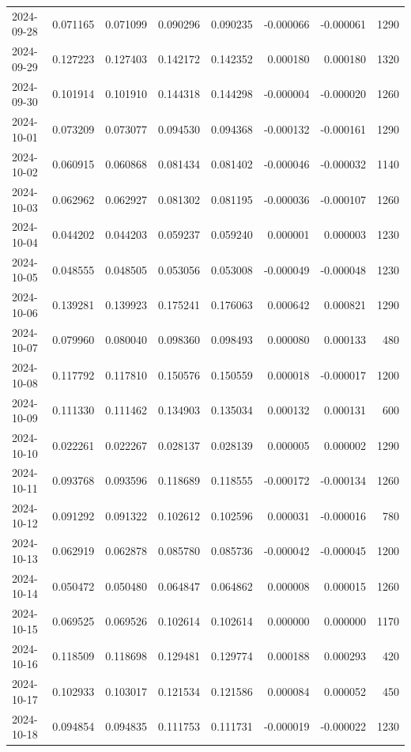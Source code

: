 \begin{tabular}{lrrrrrrr}
2024-09-28 & 0.071165 & 0.071099 & 0.090296 & 0.090235 & -0.000066 & -0.000061 & 1290 \\
2024-09-29 & 0.127223 & 0.127403 & 0.142172 & 0.142352 & 0.000180 & 0.000180 & 1320 \\
2024-09-30 & 0.101914 & 0.101910 & 0.144318 & 0.144298 & -0.000004 & -0.000020 & 1260 \\
2024-10-01 & 0.073209 & 0.073077 & 0.094530 & 0.094368 & -0.000132 & -0.000161 & 1290 \\
2024-10-02 & 0.060915 & 0.060868 & 0.081434 & 0.081402 & -0.000046 & -0.000032 & 1140 \\
2024-10-03 & 0.062962 & 0.062927 & 0.081302 & 0.081195 & -0.000036 & -0.000107 & 1260 \\
2024-10-04 & 0.044202 & 0.044203 & 0.059237 & 0.059240 & 0.000001 & 0.000003 & 1230 \\
2024-10-05 & 0.048555 & 0.048505 & 0.053056 & 0.053008 & -0.000049 & -0.000048 & 1230 \\
2024-10-06 & 0.139281 & 0.139923 & 0.175241 & 0.176063 & 0.000642 & 0.000821 & 1290 \\
2024-10-07 & 0.079960 & 0.080040 & 0.098360 & 0.098493 & 0.000080 & 0.000133 & 480 \\
2024-10-08 & 0.117792 & 0.117810 & 0.150576 & 0.150559 & 0.000018 & -0.000017 & 1200 \\
2024-10-09 & 0.111330 & 0.111462 & 0.134903 & 0.135034 & 0.000132 & 0.000131 & 600 \\
2024-10-10 & 0.022261 & 0.022267 & 0.028137 & 0.028139 & 0.000005 & 0.000002 & 1290 \\
2024-10-11 & 0.093768 & 0.093596 & 0.118689 & 0.118555 & -0.000172 & -0.000134 & 1260 \\
2024-10-12 & 0.091292 & 0.091322 & 0.102612 & 0.102596 & 0.000031 & -0.000016 & 780 \\
2024-10-13 & 0.062919 & 0.062878 & 0.085780 & 0.085736 & -0.000042 & -0.000045 & 1200 \\
2024-10-14 & 0.050472 & 0.050480 & 0.064847 & 0.064862 & 0.000008 & 0.000015 & 1260 \\
2024-10-15 & 0.069525 & 0.069526 & 0.102614 & 0.102614 & 0.000000 & 0.000000 & 1170 \\
2024-10-16 & 0.118509 & 0.118698 & 0.129481 & 0.129774 & 0.000188 & 0.000293 & 420 \\
2024-10-17 & 0.102933 & 0.103017 & 0.121534 & 0.121586 & 0.000084 & 0.000052 & 450 \\
2024-10-18 & 0.094854 & 0.094835 & 0.111753 & 0.111731 & -0.000019 & -0.000022 & 1230 \\

\end{tabular}
